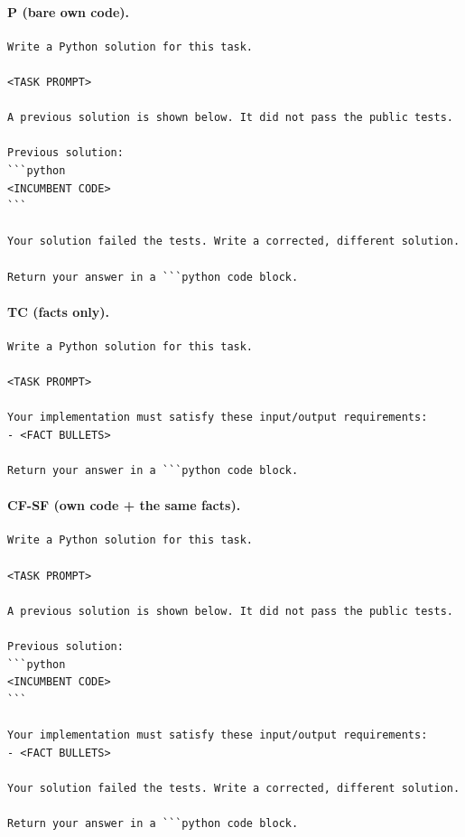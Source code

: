 \documentclass{article}
\numberwithin{equation}{section}  %
\theoremstyle{definition}
\newcommand{\armP}{\textsf{P}}
\newcommand{\armTC}{\textsf{TC}}
\newcommand{\armCF}{\textsf{CF-SF}}
\begin{document}
\paragraph{\armP{} (bare own code).}
{\small\begin{verbatim}
Write a Python solution for this task.

<TASK PROMPT>

A previous solution is shown below. It did not pass the public tests.

Previous solution:
```python
<INCUMBENT CODE>
```

Your solution failed the tests. Write a corrected, different solution.

Return your answer in a ```python code block.
\end{verbatim}}

\paragraph{\armTC{} (facts only).}
{\small\begin{verbatim}
Write a Python solution for this task.

<TASK PROMPT>

Your implementation must satisfy these input/output requirements:
- <FACT BULLETS>

Return your answer in a ```python code block.
\end{verbatim}}

\paragraph{\armCF{} (own code + the same facts).}
{\small\begin{verbatim}
Write a Python solution for this task.

<TASK PROMPT>

A previous solution is shown below. It did not pass the public tests.

Previous solution:
```python
<INCUMBENT CODE>
```

Your implementation must satisfy these input/output requirements:
- <FACT BULLETS>

Your solution failed the tests. Write a corrected, different solution.

Return your answer in a ```python code block.
\end{verbatim}}
\end{document}
